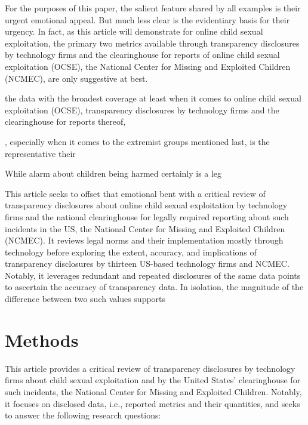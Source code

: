 \documentclass[nonacm,screen]{acmart}
\begin{document}
For the purposes of this paper, the salient feature shared by all examples is
their urgent emotional appeal. But much less clear is the evidentiary basis for
their urgency. In fact, as this article will demonstrate for online child sexual
exploitation, the primary two metrics available through transparency disclosures
by technology firms and the clearinghouse for reports of online child sexual
exploitation (OCSE), the National Center for Missing and Exploited Children
(NCMEC), are only suggestive at best.


the data with
the broadest coverage at least when it comes to online child sexual exploitation
(OCSE), transparency disclosures by technology firms and the clearinghouse for
reports thereof,



, especially when it comes
to the extremist groups mentioned last, is the  representative their





While alarm about children being harmed certainly
is a leg




This article seeks to offset that emotional bent with a critical review of
transparency disclosures about online child sexual exploitation by technology
firms and the national clearinghouse for legally required reporting about such
incidents in the US, the National Center for Missing and Exploited Children
(NCMEC). It reviews legal norms and their implementation mostly through
technology before exploring the extent, accuracy, and implications of
transparency disclosures by thirteen US-based technology firms and NCMEC.
Notably,  it leverages redundant and repeated disclosures of the same data
points to ascertain the accuracy of transparency data. In isolation, the
magnitude of the difference between two such values supports











\section{Methods}

This article provides a critical review of transparency disclosures by
technology firms about child sexual exploitation and by the United States'
clearinghouse for such incidents, the National Center for Missing and Exploited
Children. Notably, it focuses on disclosed data, i.e., reported metrics and
their quantities, and seeks to answer the following research questions:
\end{document}
